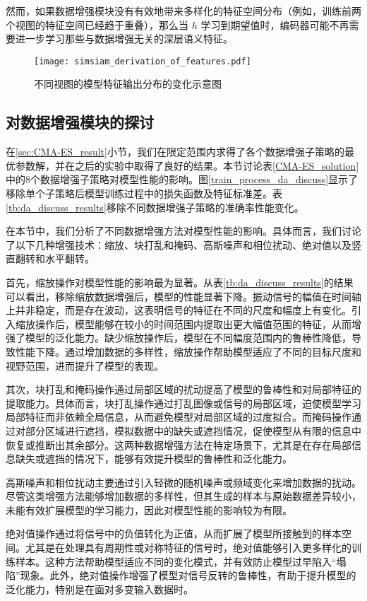 \documentclass[master]{thesis-uestc}
\begin{document}
然而，如果数据增强模块没有有效地带来多样化的特征空间分布（例如，训练前两个视图的特征空间已经趋于重叠），那么当 \( h \) 学习到期望值时，编码器可能不再需要进一步学习那些与数据增强无关的深层语义特征。

\begin{figure}[h]
    \centering
    \texttt{[image: simsiam\_derivation\_of\_features.pdf]}
    \caption{不同视图的模型特征输出分布的变化示意图}
    \label{simsiam_derivation_of_features}
\end{figure}

\subsection{对数据增强模块的探讨}
在\ref{sec:CMA-ES_result}小节，我们在限定范围内求得了各个数据增强子策略的最优参数解，并在之后的实验中取得了良好的结果。本节讨论表\ref{CMA-ES_solution}中的8个数据增强子策略对模型性能的影响。图\ref{train_process_da_discuss}显示了移除单个子策略后模型训练过程中的损失函数及特征标准差。表\ref{tb:da_discuss_results}移除不同数据增强子策略的准确率性能变化。

在本节中，我们分析了不同数据增强方法对模型性能的影响。具体而言，我们讨论了以下几种增强技术：缩放、块打乱和掩码、高斯噪声和相位扰动、绝对值以及竖直翻转和水平翻转。

首先，缩放操作对模型性能的影响最为显著。从表\ref{tb:da_discuss_results}的结果可以看出，移除缩放数据增强后，模型的性能显著下降。振动信号的幅值在时间轴上并非稳定，而是存在波动，这表明信号的特征在不同的尺度和幅度上有变化。引入缩放操作后，模型能够在较小的时间范围内提取出更大幅值范围的特征，从而增强了模型的泛化能力。缺少缩放操作后，模型在不同幅度范围内的鲁棒性降低，导致性能下降。通过增加数据的多样性，缩放操作帮助模型适应了不同的目标尺度和视野范围，进而提升了模型的表现。

其次，块打乱和掩码操作通过局部区域的扰动提高了模型的鲁棒性和对局部特征的提取能力。具体而言，块打乱操作通过打乱图像或信号的局部区域，迫使模型学习局部特征而非依赖全局信息，从而避免模型对局部区域的过度拟合。而掩码操作通过对部分区域进行遮挡，模拟数据中的缺失或遮挡情况，促使模型从有限的信息中恢复或推断出其余部分。这两种数据增强方法在特定场景下，尤其是在存在局部信息缺失或遮挡的情况下，能够有效提升模型的鲁棒性和泛化能力。

高斯噪声和相位扰动主要通过引入轻微的随机噪声或频域变化来增加数据的扰动。尽管这类增强方法能够增加数据的多样性，但其生成的样本与原始数据差异较小，未能有效扩展模型的学习能力，因此对模型性能的影响较为有限。

绝对值操作通过将信号中的负值转化为正值，从而扩展了模型所接触到的样本空间。尤其是在处理具有周期性或对称特征的信号时，绝对值能够引入更多样化的训练样本。这种方法帮助模型适应不同的变化模式，并有效防止模型过早陷入“塌陷”现象。此外，绝对值操作增强了模型对信号反转的鲁棒性，有助于提升模型的泛化能力，特别是在面对多变输入数据时。
\end{document}
